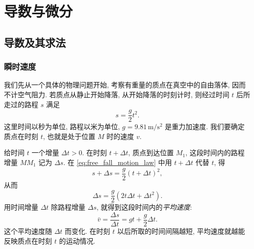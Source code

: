 \chapter{导数与微分}\label{chap:derivatives_differentials}
\section{导数及其求法}\label{sec:derivative_calculation}
\subsection{瞬时速度}\label{subsec:90}
我们先从一个具体的物理问题开始, 考察有重量的质点在真空中的自由落体,
因而不计空气阻力.
若质点从静止开始降落, 从开始降落的时刻计时,
则经过时间 $t$ 后所走过的路程 $s$ 满足
\begin{equation}\label{eq:free_fall_motion_law}
s=\frac g2t^2.
\end{equation}
这里时间以秒为单位, 路程以米为单位,
$g=9.81\,\mathrm{m/s^2}$ 是重力加速度.
我们要确定质点在时刻 $t$, 也就是处于位置 $M$ 时的速度 $v$.

\begin{figure}
    \centering
\end{figure}
给时间 $t$ 一个增量 $\Delta t>0$.
在时刻 $t+\Delta t$, 质点到达位置 $M_1$,
这段时间内的路程增量 $MM_1$ 记为 $\Delta s$.
在 \eqref{eq:free_fall_motion_law} 中用 $t+\Delta t$ 代替 $t$, 得
$$
s+\Delta s=\frac g2(t+\Delta t)^2,
$$
从而
$$
\Delta s=\frac g2(2t\Delta t+\Delta t^2).
$$
用时间增量 $\Delta t$ 除路程增量 $\Delta s$, 就得到这段时间内的\emph{平均速度}:
$$
\bar v=\frac{\Delta s}{\Delta t}=gt+\frac g2\Delta t.
$$
这个平均速度随 $\Delta t$ 而变化.
在时刻 $t$ 以后所取的时间间隔越短,
平均速度就越能反映质点在时刻 $t$ 的运动情况.


